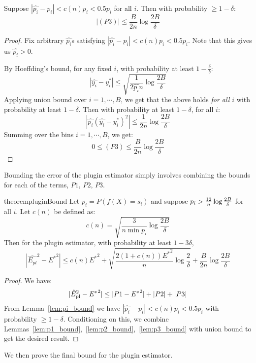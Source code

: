 \begin{lemma}[P3]
\label{lem:p3_bound}
Suppose $|\hat{p_i} - p_i| < c(n)p_i < 0.5p_i$ for all $i$. Then with probability $\geq 1 - \delta$:
\[ |(P3)| \leq \frac{B}{2n} \log{\frac{2B}{\delta}} \]
\end{lemma}

\begin{proof}
Fix arbitrary $\hat{p_i}$s satisfying $|\hat{p_i} - p_i| < c(n) p_i < 0.5p_i$. Note that this gives us $\hat{p_i} > 0$.

By Hoeffding's bound, for any fixed $i$, with probability at least $1-\frac{\delta}{b}$:
\[ |\hat{y_i} - y_i^*| \leq \sqrt{\frac{1}{2\hat{p_i}n} \log{\frac{2B}{\delta}}} \]
Applying union bound over $i = 1, \cdots, B$, we get that the above holds \emph{for all $i$} with probability at least $1 - \delta$. Then with probability at least $1 - \delta$, for all $i$:
\[ | \hat{p_i} (\hat{y_i} - y_i^*)^2 | \leq \frac{1}{2n} \log{\frac{2B}{\delta}} \]
Summing over the bins $i = 1, \cdots, B$, we get:
\[ 0 \leq (P3) \leq \frac{B}{2n} \log{\frac{2B}{\delta}}  \]
\end{proof}


Bounding the error of the plugin estimator simply involves combining the bounds for each of the terms, $P1$, $P2$, $P3$.

\begin{restatable}{theorem}{pluginBound}
\label{thm:plugin-bound}
Let $p_i = P(f(X) = s_i)$ and suppose $p_i > \frac{12}{n}\log{\frac{2B}{\delta}}{}$ for all $i$. Let $c(n)$ be defined as:
\[ c(n) = \sqrt{\frac{3}{n \min p_i} \log{\frac{2B}{\delta}}} \]
Then for the plugin estimator, with probability at least $1 - 3\delta$,
\[ | \hat{E_{pl}}^2 - {E^*}^2 | \leq c(n){E^*}^2 + \sqrt{\frac{2(1+c(n)){E^*}^2}{n} \log{\frac{2}{\delta}}} + \frac{B}{2n} \log{\frac{2B}{\delta}} \]
\end{restatable}

\begin{proof}
We have:
\[ |\hat{E}_{\textup{pl}}^2{} - {E^*}^2| \leq |P1 - {E^*}^2| + |P2| + |P3| \]
From Lemma~\ref{lem:pi_bound} we have $|\hat{p_i} - p_i| < c(n)p_i < 0.5p_i$ with probability $\geq 1 - \delta$. Conditioning on this, we combine Lemmas~\ref{lem:p1_bound},~\ref{lem:p2_bound},~\ref{lem:p3_bound} with union bound to get the desired result.
\end{proof}

We then prove the final bound for the plugin estimator.

